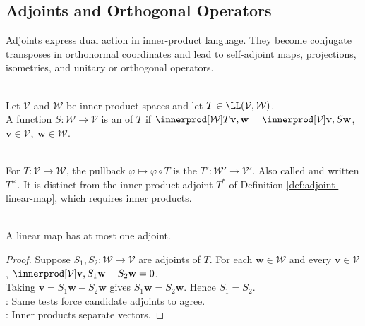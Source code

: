 \subsection{Adjoints and Orthogonal Operators}


%

Adjoints express dual action in inner-product language. They become conjugate transposes in orthonormal coordinates and lead to self-adjoint maps, projections, isometries, and unitary or orthogonal operators.

\begin{definition} \label{def:adjoint-linear-map} \\
Let $\mathcal{V}$ and $\mathcal{W}$ be inner-product spaces and let $T\in\LL(\mathcal{V},\mathcal{W})$.\\
A function $S:\mathcal{W}\to\mathcal{V}$ is an  of $T$ if $\innerprod[\mathcal{W}]{T\mathbf{v},\mathbf{w}} =\innerprod[\mathcal{V}]{\mathbf{v},S\mathbf{w}}$, $\mathbf{v}\in\mathcal{V},\ \mathbf{w}\in\mathcal{W}$.
\end{definition}

\begin{perspective} \label{per:dual-map-versus-inner-product-adjoint} \\
For $T:\mathcal{V}\to\mathcal{W}$, the pullback $\varphi\mapsto\varphi\circ T$ is the  $T':\mathcal{W}'\to\mathcal{V}'$. Also called  and written $T^\times$. It is distinct from the inner-product adjoint $T^*$ of Definition \ref{def:adjoint-linear-map}, which requires inner products.
\end{perspective}

\begin{lemma} \label{lem:adjoint-unique-if-exists} \\
A linear map has at most one adjoint.
\begin{proof}
Suppose $S_1,S_2:\mathcal{W}\to\mathcal{V}$ are adjoints of $T$. For each $\mathbf{w}\in\mathcal{W}$ and every $\mathbf{v}\in\mathcal{V}$, $\innerprod[\mathcal{V}]{\mathbf{v},S_1\mathbf{w}-S_2\mathbf{w}}=0$.\\
Taking $\mathbf{v}=S_1\mathbf{w}-S_2\mathbf{w}$ gives $S_1\mathbf{w}=S_2\mathbf{w}$. Hence $S_1=S_2$.\\
: Same tests force candidate adjoints to agree.\\
: Inner products separate vectors.
\end{proof}
\end{lemma}

